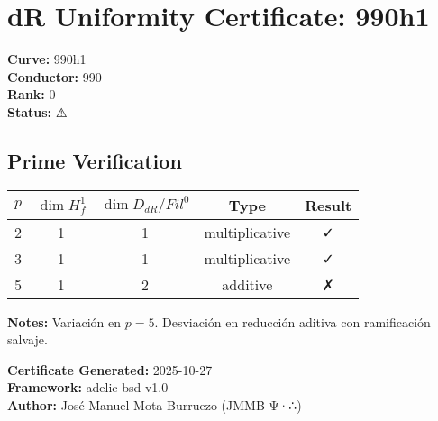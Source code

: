 \documentclass{article}
\begin{document}
\section*{dR Uniformity Certificate: 990h1}

\textbf{Curve:} 990h1\\
\textbf{Conductor:} 990\\
\textbf{Rank:} 0\\
\textbf{Status:} ⚠️

\subsection*{Prime Verification}

\begin{tabular}{|c|c|c|c|c|}
\hline
$p$ & $\dim H^1_f$ & $\dim D_{dR}/Fil^0$ & Type & Result \\
\hline
2 & 1 & 1 & multiplicative & ✓ \\
3 & 1 & 1 & multiplicative & ✓ \\
5 & 1 & 2 & additive & ✗ \\
\hline
\end{tabular}

\vspace{1em}
\textbf{Notes:} Variación en $p=5$. Desviación en reducción aditiva con ramificación salvaje.

\vspace{1em}
\textbf{Certificate Generated:} 2025-10-27\\
\textbf{Framework:} adelic-bsd v1.0\\
\textbf{Author:} José Manuel Mota Burruezo (JMMB Ψ·∴)
\end{document}
